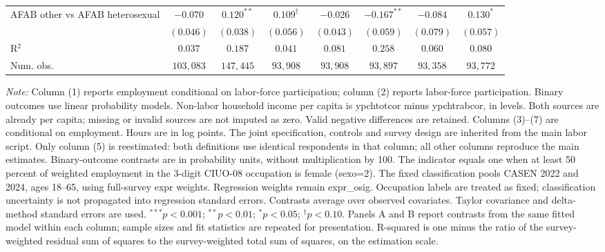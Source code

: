 \begin{table}[htpb!]
{\begin{tabular}{l c c c c c c c}
AFAB other vs AFAB heterosexual & $-0.070$ & $0.120^{**}$ & $0.109^{\dagger}$ & $-0.026$ & $-0.167^{**}$ & $-0.084$ & $0.130^{*}$ \\
 & $(0.046)$ & $(0.038)$ & $(0.056)$ & $(0.043)$ & $(0.059)$ & $(0.079)$ & $(0.057)$ \\
\hline
R$^2$ & $0.037$ & $0.187$ & $0.041$ & $0.081$ & $0.258$ & $0.060$ & $0.080$ \\
Num. obs. & $103,083$ & $147,445$ & $93,908$ & $93,908$ & $93,897$ & $93,358$ & $93,772$ \\
\hline
\end{tabular}%
}
\par\vspace{1ex}
\begin{minipage}{\textwidth}\footnotesize\raggedright
\textit{Note:} Column (1) reports employment conditional on labor-force participation; column (2) reports labor-force participation. Binary outcomes use linear probability models. Non-labor household income per capita is ypchtotcor minus ypchtrabcor, in levels. Both sources are already per capita; missing or invalid sources are not imputed as zero. Valid negative differences are retained.  Columns (3)--(7) are conditional on employment. Hours are in log points. The joint specification, controls and survey design are inherited from the main labor script. Only column (5) is reestimated: both definitions use identical respondents in that column; all other columns reproduce the main estimates. Binary-outcome contrasts are in probability units, without multiplication by 100. The indicator equals one when at least 50 percent of weighted employment in the 3-digit CIUO-08 occupation is female (sexo=2). The fixed classification pools CASEN 2022 and 2024, ages 18--65, using full-survey expr weights. Regression weights remain expr\_osig. Occupation labels are treated as fixed; classification uncertainty is not propagated into regression standard errors. Contrasts average over observed covariates. Taylor covariance and delta-method standard errors are used. $^{***}p<0.001$; $^{**}p<0.01$; $^{*}p<0.05$; $^{\dagger}p<0.10$. Panels A and B report contrasts from the same fitted model within each column; sample sizes and fit statistics are repeated for presentation. R-squared is one minus the ratio of the survey-weighted residual sum of squares to the survey-weighted total sum of squares, on the estimation scale.
\end{minipage}
\end{table}
